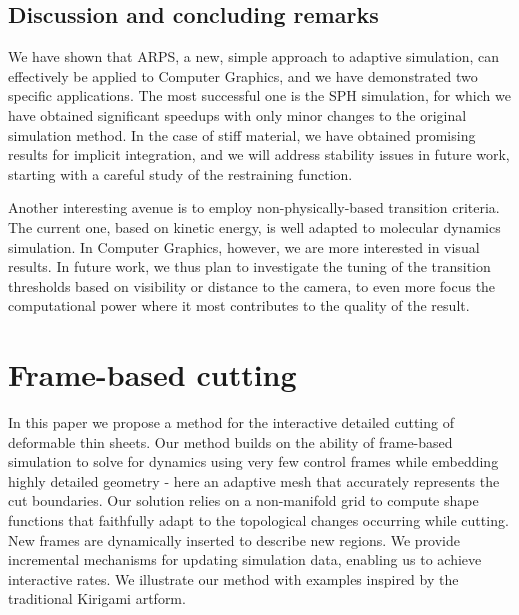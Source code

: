 \documentclass[11pt, oneside, a4paper]{memoir}
\begin{document}
\section{Discussion and concluding remarks} \label{sec discussion}
We have shown that ARPS, a new, simple approach to adaptive simulation, can effectively be applied to Computer Graphics, and we have demonstrated two specific applications.
The most successful one is the SPH simulation, for which we have obtained significant speedups with only minor changes to the original simulation method.
In the case of stiff material, we have obtained promising results for implicit integration, and we will address stability issues in future work, starting with a careful study of the restraining function.

Another interesting avenue is to employ non-physically-based transition criteria. The current one, based on kinetic energy, is well adapted to molecular dynamics simulation. In Computer Graphics, however, we are more interested in visual results. In future work, we thus plan to investigate the tuning of the transition thresholds based on visibility or distance to the camera, to even more focus the computational power where it most contributes to the quality of the result.

\chapter{Frame-based cutting}
\label{chap:cutting}


In this paper we propose a method for the interactive detailed cutting of deformable thin sheets. Our method builds on the ability of frame-based simulation to solve for dynamics using very few control frames while embedding highly detailed geometry - here an adaptive mesh that accurately represents the cut boundaries.
Our solution relies on a non-manifold grid to compute shape functions that faithfully adapt to the topological changes occurring while cutting.  New frames are dynamically inserted to describe new regions. We provide incremental mechanisms for updating simulation data, enabling us to achieve interactive rates. We illustrate our method with examples inspired by the traditional Kirigami artform.

\end{document}
